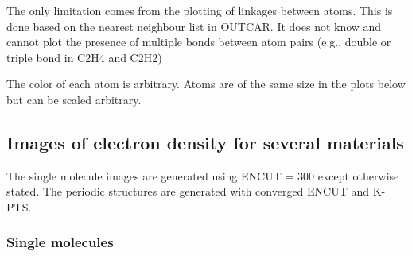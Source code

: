 \documentclass[11pt]{article}
\begin{document}
The only limitation comes from the plotting of linkages between atoms.  This is done based on the nearest neighbour list in OUTCAR.  It does not know and cannot plot the presence of multiple bonds between atom pairs (e.g., double or triple bond in C2H4 and C2H2)


The color of each atom is arbitrary.  Atoms are of the same size in the  plots below but can be scaled arbitrary.
\subsection{Images of electron density for several materials}
\label{sec-1-6}


The single molecule images are generated using ENCUT = 300 except otherwise stated.  The periodic structures are generated with converged ENCUT and K-PTS.
\subsubsection{Single molecules}
\label{sec-1-6-1}
\end{document}
